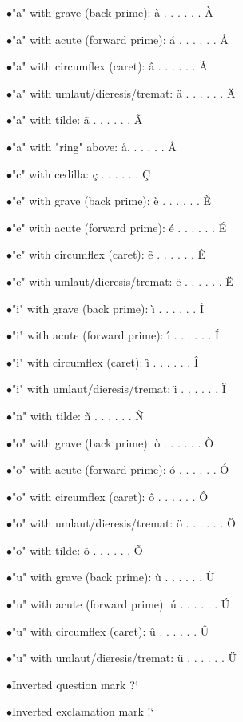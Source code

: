 \medskip 
\item{$\bullet$}"a" with grave (back prime): \`a . . . . . . \`A
\item{$\bullet$}"a" with acute (forward prime): \'a . . . . . . \'A
\item{$\bullet$}"a" with circumflex (caret): \^a . . . . . . \^A
\item{$\bullet$}"a" with umlaut/dieresis/tremat: \"a . . . . . . \"A
\item{$\bullet$}"a" with tilde: \~a . . . . . . \~A
\item{$\bullet$}"a" with "ring" above: \aa . . . . . . \AA
\item{$\bullet$}"c" with cedilla: \c c . . . . . . \c C
\item{$\bullet$}"e" with grave (back prime): \`e . . . . . . \`E
\item{$\bullet$}"e" with acute (forward prime): \'e . . . . . . \'E
\item{$\bullet$}"e" with circumflex (caret): \^e . . . . . . \^E
\item{$\bullet$}"e" with umlaut/dieresis/tremat: \"e . . . . . . \"E
\item{$\bullet$}"i" with grave (back prime): \`\i{} . . . . . . \`I
\item{$\bullet$}"i" with acute (forward prime): \'\i{} . . . . . . \'I
\item{$\bullet$}"i" with circumflex (caret): \^\i{} . . . . . . \^I
\item{$\bullet$}"i" with umlaut/dieresis/tremat: \"\i{} . . . . . . \"I
\item{$\bullet$}"n" with tilde: \~n . . . . . . \~N
\item{$\bullet$}"o" with grave (back prime): \`o . . . . . . \`O
\item{$\bullet$}"o" with acute (forward prime): \'o . . . . . . \'O
\item{$\bullet$}"o" with circumflex (caret): \^o . . . . . . \^O
\item{$\bullet$}"o" with umlaut/dieresis/tremat: \"o . . . . . . \"O
\item{$\bullet$}"o" with tilde: \~o . . . . . . \~O
\item{$\bullet$}"u" with grave (back prime): \`u . . . . . . \`U
\item{$\bullet$}"u" with acute (forward prime): \'u . . . . . . \'U
\item{$\bullet$}"u" with circumflex (caret): \^u . . . . . . \^U
\item{$\bullet$}"u" with umlaut/dieresis/tremat: \"u . . . . . . \"U
\item{$\bullet$}Inverted question mark ?`
\item{$\bullet$}Inverted exclamation mark !`
\medskip 
 

